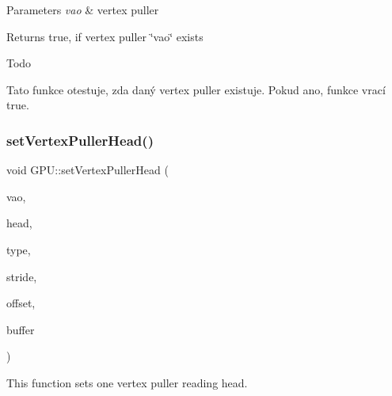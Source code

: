 \begin{DoxyParams}{Parameters}
{\em vao} & vertex puller\\
\hline
\end{DoxyParams}
\begin{DoxyReturn}{Returns}
true, if vertex puller \char`\"{}vao\char`\"{} exists 
\end{DoxyReturn}
\begin{DoxyRefDesc}{Todo}
\item[\hyperlink{todo__todo000016}{Todo}]Tato funkce otestuje, zda daný vertex puller existuje. Pokud ano, funkce vrací true. \end{DoxyRefDesc}
\mbox{\label{group__vertexpuller__tasks_gae9ffbcfa3b43ac9b3ea53e5bc44f83cc}} 
\subsubsection{\texorpdfstring{set\+Vertex\+Puller\+Head()}{setVertexPullerHead()}}
{\footnotesize\ttfamily void G\+P\+U\+::set\+Vertex\+Puller\+Head (\begin{DoxyParamCaption}\item[{\hyperlink{fwd_8hpp_af6f78f73099477c9ce5537d657597486}{Vertex\+Puller\+ID}}]{vao,  }\item[{uint32\+\_\+t}]{head,  }\item[{\hyperlink{fwd_8hpp_a349a9cde14be8097df865ba0469c0ab2}{Attribute\+Type}}]{type,  }\item[{uint64\+\_\+t}]{stride,  }\item[{uint64\+\_\+t}]{offset,  }\item[{\hyperlink{fwd_8hpp_a5114031b77b80ad895eff688720b7f93}{Buffer\+ID}}]{buffer }\end{DoxyParamCaption})}



This function sets one vertex puller reading head. 


